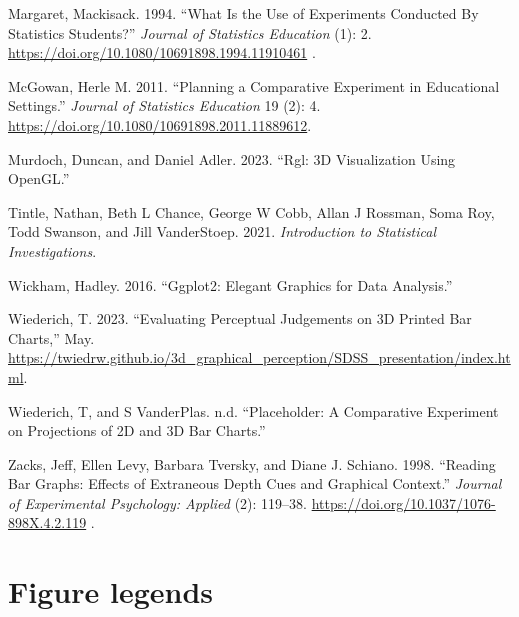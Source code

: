 \documentclass[
  12pt,
]{article}
\newlength{\cslhangindent}
\newenvironment{CSLReferences}[2] %
 {\begin{list}{}{%
  \setlength{\itemindent}{0pt}
  \setlength{\leftmargin}{0pt}
  \setlength{\parsep}{0pt}
  \ifodd #1
   \setlength{\leftmargin}{\cslhangindent}
   \setlength{\itemindent}{-1\cslhangindent}
  \fi
  \setlength{\itemsep}{#2\baselineskip}}}
 {\end{list}}
\providecommand{\DIFdel}[1]{} %
\providecommand{\DIFadd}[1]{{\protect\color{blue} \sf #1}} %
\providecommand{\DIFdel}[1]{{\protect\color{red} [..\footnote{removed: #1} ]}} %
\providecommand{\DIFaddbegin}{} %
\providecommand{\DIFaddend}{} %
\providecommand{\DIFdelbegin}{} %
\providecommand{\DIFdelend}{} %
\newcommand{\DIFscaledelfig}{0.5}
\newlength{\DIFdelgraphicswidth} %
\newlength{\DIFdelgraphicsheight} %
\newcommand{\DIFaddincludegraphics}[2][]{{\color{blue}\fbox{\DIFOincludegraphics[#1]{#2}}}} %
\newcommand{\DIFdelincludegraphics}[2][]{%
\sbox{\DIFdelgraphicsbox}{\DIFOincludegraphics[#1]{#2}}%
\settoboxwidth{\DIFdelgraphicswidth}{\DIFdelgraphicsbox} %
\settoboxtotalheight{\DIFdelgraphicsheight}{\DIFdelgraphicsbox} %
\scalebox{\DIFscaledelfig}{%
\parbox[b]{\DIFdelgraphicswidth}{\usebox{\DIFdelgraphicsbox}\\[-\baselineskip] \rule{\DIFdelgraphicswidth}{0em}}\llap{\resizebox{\DIFdelgraphicswidth}{\DIFdelgraphicsheight}{%
\setlength{\unitlength}{\DIFdelgraphicswidth}%
\begin{picture}(1,1)%
\thicklines\linethickness{2pt} %
{\color[rgb]{1,0,0}\put(0,0){\framebox(1,1){}}}%
{\color[rgb]{1,0,0}\put(0,0){\line( 1,1){1}}}%
{\color[rgb]{1,0,0}\put(0,1){\line(1,-1){1}}}%
\end{picture}%
}\hspace*{3pt}}} %
} %
\DeclareRobustCommand{\DIFaddbegin}{\DIFOaddbegin \let\includegraphics\DIFaddincludegraphics} %
\DeclareRobustCommand{\DIFaddend}{\DIFOaddend \let\includegraphics\DIFOincludegraphics} %
\DeclareRobustCommand{\DIFdelbegin}{\DIFOdelbegin \let\includegraphics\DIFdelincludegraphics} %
\DeclareRobustCommand{\DIFdelend}{\DIFOaddend \let\includegraphics\DIFOincludegraphics} %
\begin{document}
\begin{CSLReferences}{1}{0}
\DIFaddbegin {}
\DIFadd{Margaret, Mackisack. 1994. }{\DIFadd{``What Is the Use of Experiments Conducted
By Statistics Students?''}} \emph{\DIFadd{Journal of Statistics Education}} \DIFadd{2 (1):
2. }\url{https://doi.org/10.1080/10691898.1994.11910461}\DIFadd{.
}

\DIFaddend {}
McGowan, Herle M. 2011. {``Planning a Comparative Experiment in
Educational Settings.''} \emph{Journal of Statistics Education} 19 (2):
4. \url{https://doi.org/10.1080/10691898.2011.11889612}.

Murdoch, Duncan, and Daniel Adler. 2023. {``Rgl: 3D Visualization Using
OpenGL.''}

Tintle, Nathan, Beth L Chance, George W Cobb, Allan J Rossman, Soma Roy,
Todd Swanson, and Jill VanderStoep. 2021. \emph{Introduction to
Statistical Investigations}.

Wickham, Hadley. 2016. {``Ggplot2: Elegant Graphics for Data
Analysis.''}

Wiederich, T. 2023. {``Evaluating Perceptual Judgements on 3D Printed
Bar Charts,''} May.
\url{https://twiedrw.github.io/3d_graphical_perception/SDSS_presentation/index.html}.

Wiederich, T, and S VanderPlas. n.d. {``Placeholder: A Comparative
Experiment on Projections of 2D and 3D Bar Charts.''}

\DIFaddbegin {}
\DIFadd{Zacks, Jeff, Ellen Levy, Barbara Tversky, and Diane J. Schiano. 1998.
}{\DIFadd{``Reading Bar Graphs: Effects of Extraneous Depth Cues and Graphical
Context.''}} \emph{\DIFadd{Journal of Experimental Psychology: Applied}} \DIFadd{4 (2):
119--38. }\url{https://doi.org/10.1037/1076-898X.4.2.119}\DIFadd{.
}

\DIFaddend \end{CSLReferences}

\newpage

\section{\DIFdelbegin \DIFdel{Figures}\DIFdelend \DIFaddbegin \DIFadd{Figure legends}\DIFaddend }\DIFdelbegin %
\DIFdelend \DIFaddbegin \label{figure-legends}
\DIFaddend 
\end{document}
